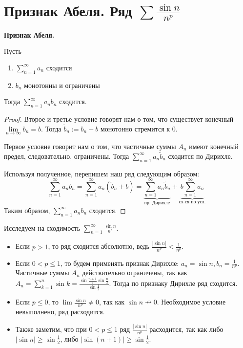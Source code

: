 \section{Признак Абеля. Ряд $\sum \frac{\sin n}{n^p}$}
\textbf{Признак Абеля.} 

Пусть \begin{enumerate}
    \item $\sum\limits_{n=1}^\infty a_n$ сходится
    \item $b_n$ монотонны и ограничены
\end{enumerate}
Тогда $\sum\limits_{n=1}^\infty a_nb_n$ сходится.
\begin{proof}
    Второе и третье условие говорят нам о том, что существует конечный $\lim\limits_{n \to \infty} b_n = b$.
    Тогда $\widetilde{b}_n := b_n - b$ монотонно стремится к 0.

    \quad Первое условие говорит нам о том, что частичные суммы $A_n$ имеют конечный предел, следовательно, ограничены.
    Тогда $\sum\limits_{n=1}^\infty a_n\widetilde{b}_n$ сходится по Дирихле.

    \quad Используя полученное, перепишем наш ряд следующим образом: \[ \sum_{n=1}^\infty a_nb_n = \sum_{n=1}^\infty a_n(\widetilde{b}_n + b) = \underbrace{\sum_{n=1}^\infty a_n\widetilde{b}_n}_{\text{пр. Дирихле}} + \underbrace{b\sum_{n=1}^\infty a_n}_{\text{сх-ся по усл.}} \]
    \quad Таким образом, $\sum\limits_{n=1}^\infty a_nb_n$ сходится.
\end{proof}

\vspace{4mm}

\begin{example}
    Исследуем на сходимость $\sum\limits_{n=1}^\infty \frac{\sin n}{n^p}$.
    \begin{itemize}
        \item Если $p > 1$, то ряд сходится абсолютно, ведь $\frac{|\sin n|}{n^p} \leqslant \frac{1}{n^p}$.
        \item Если $0 < p \leqslant 1$, то будем применять признак Дирихле: $a_n = \sin n, b_n = \frac{1}{n^p}$. 
        Частичные суммы $A_n$ действительно ограничены, так как $A_n = \sum\limits_{k=1}^n \sin k = \frac{\sin \frac{n+1}{2}\sin \frac{n}{2}}{\sin \frac{1}{2}}$. Тогда по признаку Дирихле ряд сходится.
        \item Если $p \leqslant 0$, то $\lim \frac{\sin n}{n^p} \neq 0$, так как $\sin n \nrightarrow 0$. Необходимое условие невыполнено, ряд расходится.
        \item Также заметим, что при $0 < p \leqslant 1$ ряд $\frac{|\sin n|}{n^p}$ расходится, так как либо $|\sin n| \geqslant \sin \frac{1}{2}$, либо $|\sin (n+1)| \geqslant \sin \frac{1}{2}$.
    \end{itemize}
\end{example}

